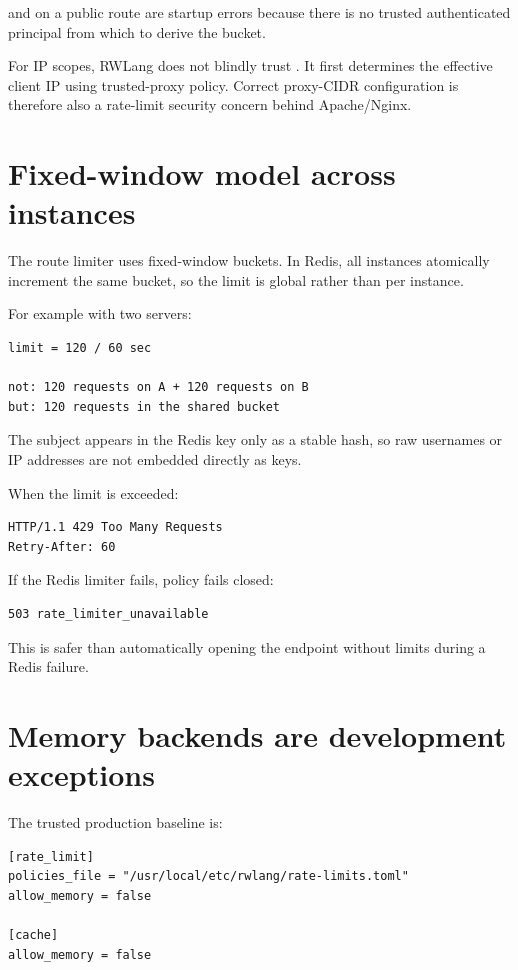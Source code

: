  and  on a public route are startup errors because there is no trusted authenticated principal from which to derive the bucket.

For IP scopes, RWLang does not blindly trust . It first determines the effective client IP using trusted-proxy policy. Correct proxy-CIDR configuration is therefore also a rate-limit security concern behind Apache/Nginx.

\section{Fixed-window model across instances}

The route limiter uses fixed-window buckets. In Redis, all instances atomically increment the same bucket, so the limit is global rather than per instance.

For example with two servers:

\begin{lstlisting}
limit = 120 / 60 sec

not: 120 requests on A + 120 requests on B
but: 120 requests in the shared bucket
\end{lstlisting}

The subject appears in the Redis key only as a stable hash, so raw usernames or IP addresses are not embedded directly as keys.

When the limit is exceeded:

\begin{lstlisting}
HTTP/1.1 429 Too Many Requests
Retry-After: 60
\end{lstlisting}

If the Redis limiter fails, policy fails closed:

\begin{lstlisting}
503 rate_limiter_unavailable
\end{lstlisting}

This is safer than automatically opening the endpoint without limits during a Redis failure.

\section{Memory backends are development exceptions}

The trusted production baseline is:

\begin{lstlisting}
[rate_limit]
policies_file = "/usr/local/etc/rwlang/rate-limits.toml"
allow_memory = false

[cache]
allow_memory = false
\end{lstlisting}

